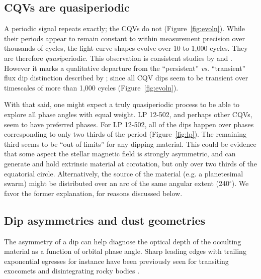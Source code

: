 \documentclass[11pt,twocolumn,tighten]{aastex63}
\begin{document}
\subsection{CQVs are quasiperiodic}

A periodic signal repeats exactly; the CQVs do not
(Figure~\ref{fig:evoln}).  While their periods appear to remain
constant to within measurement precision over thousands of cycles, the
light curve shapes evolve over 10 to 1{,}000 cycles.  They are
therefore {\it quasi}periodic.  This observation is consistent studies
by \citet{2022AJ....163..144G} and \citet{2023ApJ...945..114P}.
However it marks a qualitative departure from the ``persistent'' {\it
vs.} ``transient'' flux dip distinction described by
\citet{2017AJ....153..152S};  since all CQV dips seem to be transient
over timescales of more than 1{,}000 cycles (Figure~\ref{fig:evoln}).

With that said, one might expect a truly quasiperiodic process to be
able to explore all phase angles with equal weight.  LP 12-502, and
perhaps other CQVs, seem to have preferred phases.  For LP 12-502, all
of the dips happen over phases corresponding to only two thirds of the
period (Figure~\ref{fig:lp}).  The remaining third seems to be ``out
of limits'' for any dipping material.  This could be evidence that
some aspect the stellar magnetic field is strongly asymmetric, and can
generate and hold extrinsic material at corotation, but only over two
thirds of the equatorial circle.  Alternatively, the source of the
material (e.g. a planetesimal swarm) might be distributed over an arc
of the same angular extent (240$^\circ$).  We favor the former
explanation, for reasons discussed below.



\subsection{Dip asymmetries and dust geometries}

The asymmetry of a dip can help diagnose the optical depth of the
occulting material as a function of orbital phase angle.  Sharp
leading edges with trailing exponential egresses for instance have
been previously seen for transiting exocomets and disintegrating rocky
bodies
\citep[e.g.][]{2012ApJ...752....1R,2012A&A...545L...5B,2015Natur.526..546V,2019A&A...625L..13Z}.
\end{document}
